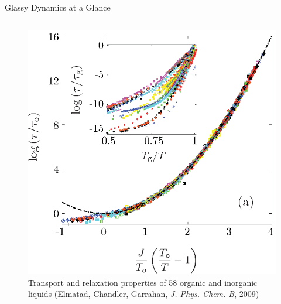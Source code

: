 \begin{frame}{Glassy Dynamics at a Glance}
\begin{columns}
\begin{column}{0.5\linewidth}
\begin{figure}
\begin{overprint}
    
    
    
    
    
    
    
    \centering\includegraphics[height=0.675\textheight]{intro_glassy/newFigure1_v_9.eps}
    \caption{Transport and relaxation properties of 58 organic and inorganic liquids (Elmatad, Chandler, Garrahan, \textit{J. Phys. Chem. B},  2009)}
    

\end{overprint}
\end{figure}
\end{column}
\end{columns}
\end{frame}
